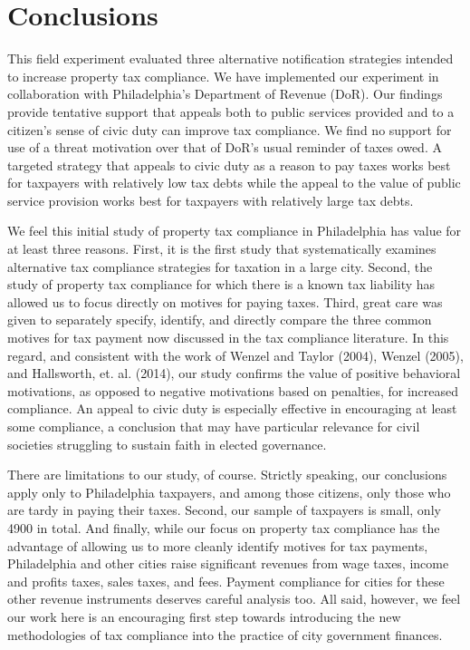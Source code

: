 \documentclass[12pt,titlepage]{article}
\begin{document}
\section{Conclusions}

This field experiment evaluated three alternative notification strategies intended to increase property tax compliance.  We have implemented our experiment in collaboration with Philadelphia's Department of Revenue (DoR).  Our findings provide tentative support that appeals both to public services provided and to a citizen's sense of civic duty can improve tax compliance.  We find no support for use of a threat motivation over that of DoR's usual reminder of taxes owed.  A targeted strategy that appeals to civic duty as a reason to pay taxes works best for taxpayers with relatively low tax debts while the appeal to the value of public service provision works best for taxpayers with relatively large tax debts.

We feel this initial study of property tax compliance in Philadelphia has value for at least three reasons.  First, it is the first study that systematically examines alternative tax compliance strategies for taxation in a large city.  Second, the study of property tax compliance for which there is a known tax liability has allowed us to focus directly on motives for paying taxes.  Third, great care was given to separately specify, identify, and directly compare the three common motives for tax payment now discussed in the tax compliance literature.   In this regard, and consistent with the work of Wenzel and Taylor (2004), Wenzel (2005), and Hallsworth, et. al. (2014), our study confirms the value of positive behavioral motivations, as opposed to negative motivations based on penalties, for increased compliance.  An appeal to civic duty is especially effective in encouraging at least some compliance, a conclusion that may have particular relevance for civil societies struggling to sustain faith in elected governance.  

	There are limitations to our study, of course.  Strictly speaking, our conclusions apply only to Philadelphia taxpayers, and among those citizens, only those who are tardy in paying their taxes. 
Second, our sample of taxpayers is small, only 4900 in total.  And finally, while our focus on property tax compliance has the advantage of allowing us to more cleanly identify motives for tax payments, Philadelphia and other cities raise significant revenues from wage taxes, income and profits taxes, sales taxes, and fees.  Payment compliance for cities for these other revenue instruments deserves careful analysis too.  All said, however, we feel our work here is an encouraging first step towards introducing the new methodologies of tax compliance into the practice of city government finances.   
\end{document}
